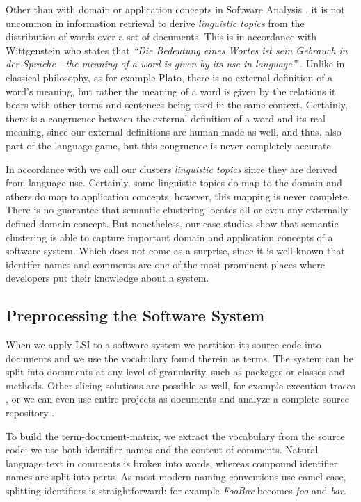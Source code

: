 \documentclass[10pt]{book}
\begin{document}
Other than with domain or application concepts in Software Analysis \cite{Bigg93a}, it is not uncommon in information retrieval to derive \emph{linguistic topics} from the distribution of words over a set of documents. This is in accordance with Wittgenstein who states that \emph{``Die Bedeutung eines Wortes ist sein Gebrauch in der Sprache---the meaning of a word is given by its use in language''} \cite{Witt53a}. Unlike in classical philosophy, as for example Plato, there is no external definition of a word's meaning, but rather the meaning of a word is given by the relations it bears with other terms and sentences being used in the same context. Certainly, there is a congruence between the external definition of a word and its real meaning, since our external definitions are human-made as well, and thus, also part of the language game, but this congruence is never completely accurate.

In accordance with \cite{Bigg89c} we call our clusters \emph{linguistic topics} since they are derived from language use. Certainly, some linguistic topics do map to the domain and others do map to application concepts, however, this mapping is never complete. There is no guarantee that semantic clustering locates all or even any externally defined domain concept. But nonetheless, our case studies show that semantic clustering is able to capture important domain and application concepts of a software system. Which does not come as a surprise, since it is well known that identifer names and comments are one of the most prominent places where developers put their knowledge about a system.

\subsection{Preprocessing the Software System}\label{sec:parsing}

When we apply LSI to a software system we partition its source code into documents and we use the vocabulary found therein as terms. The system can be split into documents at any level of granularity, such as packages or classes and methods. Other slicing solutions are possible as well, for example execution traces \cite{Kuhn05b}, or we can even use entire projects as documents and analyze a complete source repository \cite{Kawa04a}.

To build the term-document-matrix, we extract the vocabulary from the source code: we use both identifier names and the content of comments. Natural language text in comments is broken into words, whereas compound identifier names are split into parts. As most modern naming conventions use camel case, splitting identifiers is straightforward: for example \emph{FooBar} becomes \emph{foo} and \emph{bar}.
\end{document}
